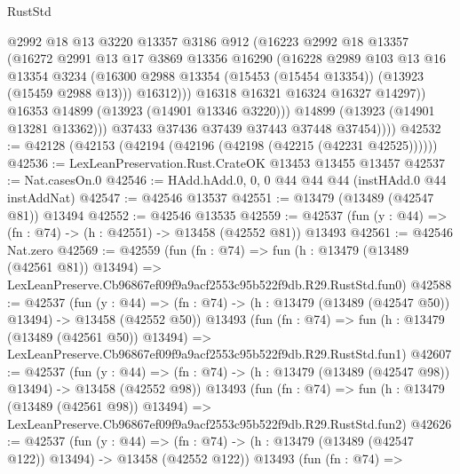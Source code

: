 \begin{lexlean}{RustStd}
\begin{coremodule}
                    @2992
                    @18
                    @13
                    @3220
                    @13357
                    @3186
                    @912
                    (@16223
                      @2992
                      @18
                      @13357
                      (@16272
                        @2991
                        @13
                        @17
                        @3869
                        @13356
                        @16290
                        (@16228
                          @2989
                          @103
                          @13
                          @16
                          @13354
                          @3234
                          (@16300 @2988 @13354 (@15453 (@15454 @13354)) (@13923 (@15459 @2988 @13)))
                          @16312)))
                    @16318
                    @16321
                    @16324
                    @16327
                    @14297))
                @16353
                @14899
                (@13923 (@14901 @13346 @3220)))
              @14899
              (@13923 (@14901 @13281 @13362)))
            @37433
            @37436
            @37439
            @37443
            @37448
            @37454))))
@42532 := @42128 (@42153 (@42194 (@42196 (@42198 (@42215 (@42231 @42525))))))
@42536 := LexLeanPreservation.Rust.CrateOK @13453 @13455 @13457
@42537 := Nat.casesOn.{0}
@42546 := HAdd.hAdd.{0, 0, 0} @44 @44 @44 (instHAdd.{0} @44 instAddNat)
@42547 := @42546 @13537
@42551 := @13479 (@13489 (@42547 @81)) @13494
@42552 := @42546 @13535
@42559 := @42537 (fun (y : @44) => (fn : @74) -> (h : @42551) -> @13458 (@42552 @81)) @13493
@42561 := @42546 Nat.zero
@42569 := @42559
    (fun (fn : @74) =>
    fun (h : @13479 (@13489 (@42561 @81)) @13494) =>
    LexLeanPreserve.Cb96867ef09f9a9acf2553c95b522f9db.R29.RustStd.fun0)
@42588 := @42537
    (fun (y : @44) =>
    (fn : @74) -> (h : @13479 (@13489 (@42547 @50)) @13494) -> @13458 (@42552 @50))
    @13493
    (fun (fn : @74) =>
    fun (h : @13479 (@13489 (@42561 @50)) @13494) =>
    LexLeanPreserve.Cb96867ef09f9a9acf2553c95b522f9db.R29.RustStd.fun1)
@42607 := @42537
    (fun (y : @44) =>
    (fn : @74) -> (h : @13479 (@13489 (@42547 @98)) @13494) -> @13458 (@42552 @98))
    @13493
    (fun (fn : @74) =>
    fun (h : @13479 (@13489 (@42561 @98)) @13494) =>
    LexLeanPreserve.Cb96867ef09f9a9acf2553c95b522f9db.R29.RustStd.fun2)
@42626 := @42537
    (fun (y : @44) =>
    (fn : @74) -> (h : @13479 (@13489 (@42547 @122)) @13494) -> @13458 (@42552 @122))
    @13493
    (fun (fn : @74) =>

\end{coremodule}
\end{lexlean}
